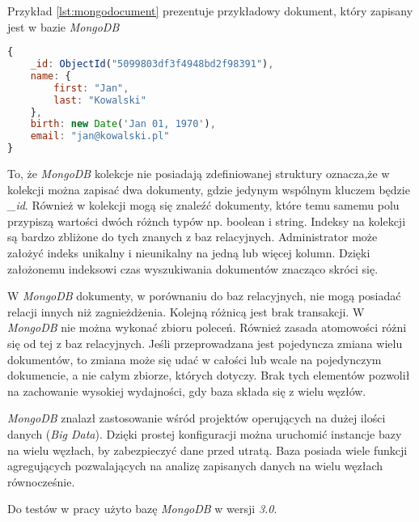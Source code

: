  Przykład \ref{lst:mongodocument} prezentuje przykładowy dokument, który zapisany jest w bazie \textsl{MongoDB}

\begin{lstlisting}[language=JavaScript,caption=Przykład dokumentu zapisanego w bazie MongoDB,label={lst:mongodocument}]
{
    _id: ObjectId("5099803df3f4948bd2f98391"),
    name: { 
        first: "Jan", 
        last: "Kowalski" 
    },
    birth: new Date('Jan 01, 1970'),
    email: "jan@kowalski.pl"
}
\end{lstlisting}

To, że \textsl{MongoDB} kolekcje nie posiadają zdefiniowanej struktury oznacza,że w kolekcji można zapisać dwa dokumenty, gdzie jedynym wspólnym kluczem będzie \textsl{\_id}. Również w kolekcji mogą się znaleźć dokumenty, które temu samemu polu przypiszą wartości dwóch różnch typów np. boolean i string. Indeksy na kolekcji są bardzo zbliżone do tych znanych z baz relacyjnych. Administrator może założyć indeks unikalny i nieunikalny na jedną lub więcej kolumn. Dzięki założonemu indeksowi czas wyszukiwania dokumentów znacząco skróci się.

W \textsl{MongoDB} dokumenty, w porównaniu do baz relacyjnych, nie mogą posiadać relacji innych niż zagnieżdżenia. Kolejną różnicą jest brak transakcji. W \textsl{MongoDB} nie można wykonać zbioru poleceń. Również zasada atomowości różni się od tej z baz relacyjnych. Jeśli przeprowadzana jest pojedyncza zmiana wielu dokumentów, to zmiana może się udać w całości lub wcale na pojedynczym dokumencie, a nie całym zbiorze, których dotyczy. Brak tych elementów pozwolił na zachowanie wysokiej wydajności, gdy baza składa się z wielu węzłów.

\textsl{MongoDB} znalazł zastosowanie wśród projektów operujących na dużej ilości danych (\textsl{Big Data}). Dzięki prostej konfiguracji można uruchomić instancje bazy na wielu węzłach, by zabezpieczyć dane przed utratą. Baza posiada wiele funkcji agregujących pozwalających na analizę zapisanych danych na wielu węzłach równocześnie. 

Do testów w pracy użyto bazę \textsl{MongoDB} w wersji \textsl{3.0}.


